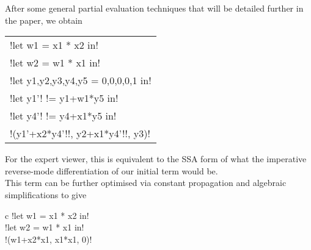 \begin{example}
After some general partial evaluation techniques that will be detailed further in the paper, we obtain     
    \begin{center}
            \begin{tabular}{l}
                !let w1 = x1 * x2 in!\\ 
                !let w2 = w1 * x1 in!\\
                !let y1,y2,y3,y4,y5 = 0,0,0,0,1 in!\\
                !let y1'! != y1+w1*y5 in!\\
                !let y4'! != y4+x1*y5 in!\\
                !(y1'+x2*y4'!!, y2+x1*y4'!!, y3)!
            \end{tabular}
    \end{center}   
For the expert viewer, this is equivalent to the SSA form \cite{cytron1989efficient} of what the imperative reverse-mode differentiation of our initial term would be.\\
This term can be further optimised via constant propagation and algebraic simplifications to give
        \begin{center}
            \begin{tabular}{{c}}
                !let w1 = x1 * x2 in!\\ 
                !let w2 = w1 * x1 in!\\
                !(w1+x2*x1, x1*x1, 0)!
            \end{tabular}
        \end{center}
    \end{example}

